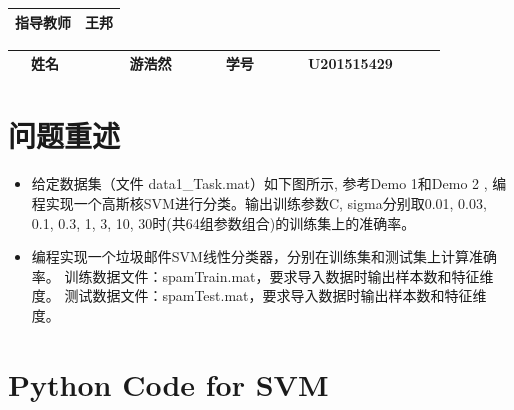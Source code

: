 \documentclass[UTF-8, a4paper, 10pt]{article}
\numberwithin{equation}{section}
\begin{document}
\begin{titlepage}
\begin{center}
\begin{table}[!hbp]
\begin{tabular}{|c|c|}
     		\hline
     		指导教师 & 王邦 \\
     		\hline
     		\end{tabular}     		
       \end{table}
       \vspace{2cm}
      \begin{table}[htbp]
      \centering
      \renewcommand\arraystretch{1.5}
     	\begin{tabular}{|c|c|c|c|}
     		\hline
            \qquad ~~姓名~~~~~  & \qquad ~~游浩然~~~~~  & \qquad 学号~~~~~ & \qquad U201515429~~~~~ \\
     		\hline
     		\end{tabular}
       \end{table}
       \date{2018年5月29日}
     \end{center}
\end{titlepage}

\section{问题重述}
\begin{itemize}
  \item 给定数据集（文件 data1\_Task.mat）如下图所示, 参考Demo 1和Demo 2 , 编程实现一个高斯核SVM进行分类。输出训练参数C, sigma分别取0.01, 0.03, 0.1, 0.3, 1, 3, 10, 30时(共64组参数组合)的训练集上的准确率。
  \item 编程实现一个垃圾邮件SVM线性分类器，分别在训练集和测试集上计算准确率。
        训练数据文件：spamTrain.mat，要求导入数据时输出样本数和特征维度。
        测试数据文件：spamTest.mat，要求导入数据时输出样本数和特征维度。

\end{itemize}

\section{Python Code for SVM}
\end{document}
